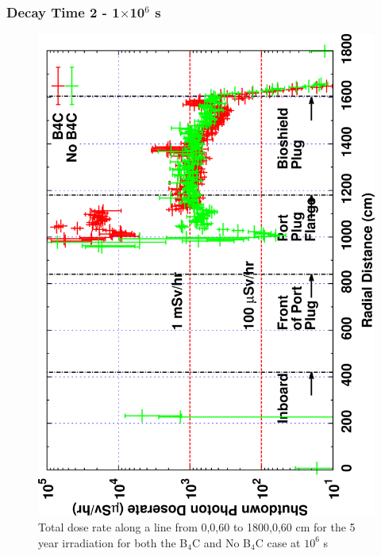 \documentclass[12pt]{article}
\begin{document}
\subsubsection{Decay Time 2 - 1$\times$10$^{6}$ s}
\begin{figure}[ht!]
\centering
\includegraphics[clip,scale=0.12,angle=-90]{../plots/photon_lineout/comp/5yr_dc2.png}
\caption{Total dose rate along a line from 0,0,60 to 1800,0,60 cm for the 5 year irradiation
for both the B$_4$C and No B$_4$C case at $10^6$ s}
\label{fig:photons_5y_dc2_dose}
\end{figure}
\end{document}
